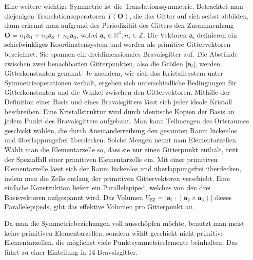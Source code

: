 Eine weitere wichtige Symmetrie ist die Translationssymmetrie.
Betrachtet man diejenigen Translationsoperatoren $T(\mathbf{O})$, die das Gitter auf sich selbst abbilden, dann erkennt
man aufgrund der Periodizität des Gitters den Zusammenhang
$\mathbf{O} = n_{1}\mathbf{a}_{1}+n_{2}\mathbf{a}_{2}+n_{3}\mathbf{a}_{3}$, wobei
$\mathbf{a}_{i}\in\mathbb{R}^{3}, n_{i}\in\mathbb{Z}$. \autocite[50]{Hunklinger}
Die Vektoren $\mathbf{a}_{i}$
definieren ein schiefwinkliges Koordinatensystem und werden als primitive Gittervektoren bezeichnet.
Sie spannen ein dreidimensionales Bravaisgitter auf.
Die Abstände zwischen zwei benachbarten Gitterpunkten, also die Größen
$\lvert \mathbf{a}_{i} \rvert$, werden Gitterkonstanten genannt. \autocite[82]{Ashcroft}
Je nachdem, wie sich das Kristallsystem unter Symmetrieoperationen verhält, ergeben sich unterschiedliche Bedingungen für
Gitterkonstanten und die Winkel zwischen den Gittervektoren.
Mithilfe der Definition einer Basis und eines Bravaisgitters lässt sich jeder ideale Kristall beschreiben.
Eine Kristallstruktur wird durch identische Kopien der Basis an jedem Punkt des Bravaisgitters aufgebaut.
\autocite[94-95]{Ashcroft}
Man kann Teilmengen des Ortsraumes geschickt wählen, die durch Aneinanderreihung den gesamten Raum lückenlos und
überlappungsfrei überdecken.
Solche Mengen nennt man Elementarzellen.
Wählt man die Elementarzelle so, dass sie nur einen Gitterpunkt enthält, tritt der Spezialfall einer primitiven
Elementarzelle ein.
Mit einer primitiven Elementarzelle lässt sich der Raum lückenlos und überlappungsfrei überdecken, indem man die Zelle
entlang der primitiven Gittervektoren verschiebt.
Eine einfache Konstruktion liefert ein Parallelepiped, welches von den drei Basisvektoren aufgespannt wird.
Das Volumen $V_\mathrm{EZ}= \lvert \mathbf{a}_1 \cdot (\mathbf{a}_2 \times  \mathbf{a}_3) \rvert$ dieses
Parallelepipeds, gibt das effektive Volumen pro Gitterpunkt an.
\autocite[90-91]{Ashcroft}


Da man die Symmetriebeziehungen voll ausschöpfen möchte, benutzt man meist keine primitiven Elementarzellen, sondern
wählt geschickt nicht-primitive Elementarzellen, die möglichst viele Punktsymmetrieelemente beinhalten.
Das führt zu einer Einteilung in 14 Bravaisgitter. \autocite[51]{Hunklinger}

